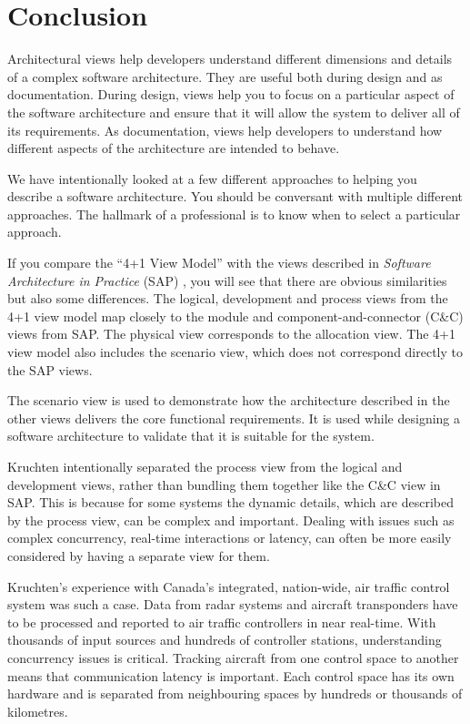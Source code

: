 \section{Conclusion}
Architectural views help developers understand different dimensions and details of a complex software architecture.
They are useful both during design and as documentation.
During design, views help you to focus on a particular aspect of the software architecture and ensure that it will allow the system to deliver all of its requirements.
As documentation, views help developers to understand how different aspects of the architecture are intended to behave.

We have intentionally looked at a few different approaches to helping you describe a software architecture.
You should be conversant with multiple different approaches.
The hallmark of a professional is to know when to select a particular approach.

If you compare the ``4+1 View Model'' \cite{4+1-model} with the views described in \textit{Software Architecture in Practice} (SAP) \cite{bass2021software},
you will see that there are obvious similarities but also some differences.
The logical, development and process views from the 4+1 view model map closely to the module and component-and-connector (C\&C) views from SAP.
The physical view corresponds to the allocation view.
The 4+1 view model also includes the scenario view, which does not correspond directly to the SAP views.

The scenario view is used to demonstrate how the architecture described in the other views delivers the core functional requirements.
It is used while designing a software architecture to validate that it is suitable for the system.

Kruchten intentionally separated the process view from the logical and development views,
rather than bundling them together like the C\&C view in SAP.
This is because for some systems the dynamic details, which are described by the process view, can be complex and important.
Dealing with issues such as complex concurrency, real-time interactions or latency, can often be more easily considered by having a separate view for them.

Kruchten's experience with Canada's integrated, nation-wide, air traffic control system was such a case.
Data from radar systems and aircraft transponders have to be processed and reported to air traffic controllers in near real-time.
With thousands of input sources and hundreds of controller stations, understanding concurrency issues is critical.
Tracking aircraft from one control space to another means that communication latency is important.
Each control space has its own hardware and is separated from neighbouring spaces by hundreds or thousands of kilometres.

